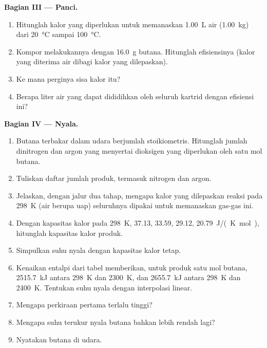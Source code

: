 \begin{problem}
\medskip
\noindent\textbf{Bagian III --- Panci.}
\begin{enumerate}[resume]
  \item Hitunglah kalor yang diperlukan untuk memanaskan \qty{1.00}{L} air
        (\qty{1.00}{kg}) dari \qty{20}{\celsius} sampai \qty{100}{\celsius}.
  \item Kompor melakukannya dengan \qty{16.0}{g} butana. Hitunglah
        efisiensinya (kalor yang diterima air dibagi kalor yang
        dilepaskan).
  \item Ke mana perginya sisa kalor itu?
  \item Berapa liter air yang dapat dididihkan oleh seluruh kartrid
        dengan efisiensi ini?
\end{enumerate}

\medskip
\noindent\textbf{Bagian IV --- Nyala.}
\begin{enumerate}[resume]
  \item Butana terbakar dalam udara berjumlah stoikiometris. Hitunglah
        jumlah dinitrogen dan argon yang menyertai dioksigen yang
        diperlukan oleh satu mol butana.
  \item Tuliskan daftar jumlah produk, termasuk nitrogen dan argon.
  \item Jelaskan, dengan jalur dua tahap, mengapa kalor yang dilepaskan
        reaksi pada \qty{298}{K} (air berupa uap) seluruhnya dipakai untuk
        memanaskan gas-gas ini.
  \item Dengan kapasitas kalor pada \qty{298}{K},  37.13,
         33.59,  29.12,  \qty{20.79}{J/(K.mol)},
        hitunglah kapasitas kalor produk.
  \item Simpulkan suhu nyala dengan kapasitas kalor tetap.
  \item Kenaikan entalpi dari tabel memberikan, untuk produk satu mol
        butana, \qty{2515.7}{kJ} antara \qty{298}{K} dan \qty{2300}{K},
        dan \qty{2655.7}{kJ} antara \qty{298}{K} dan \qty{2400}{K}.
        Tentukan suhu nyala dengan interpolasi linear.
  \item Mengapa perkiraan pertama terlalu tinggi?
  \item Mengapa suhu terukur nyala butana bahkan lebih rendah lagi?
  \item Nyatakan  butana di udara.
\end{enumerate}
\end{problem}
